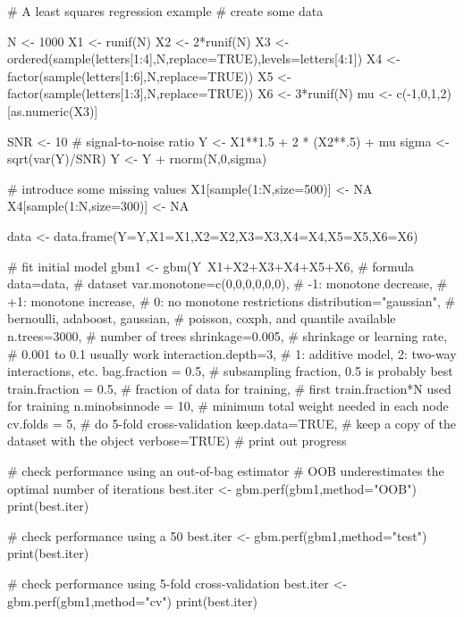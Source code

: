 \documentclass{article}
\begin{document}
\begin{Examples}
\begin{ExampleCode}
# A least squares regression example
# create some data

N <- 1000
X1 <- runif(N)
X2 <- 2*runif(N)
X3 <- ordered(sample(letters[1:4],N,replace=TRUE),levels=letters[4:1])
X4 <- factor(sample(letters[1:6],N,replace=TRUE))
X5 <- factor(sample(letters[1:3],N,replace=TRUE))
X6 <- 3*runif(N)
mu <- c(-1,0,1,2)[as.numeric(X3)]

SNR <- 10 # signal-to-noise ratio
Y <- X1**1.5 + 2 * (X2**.5) + mu
sigma <- sqrt(var(Y)/SNR)
Y <- Y + rnorm(N,0,sigma)

# introduce some missing values
X1[sample(1:N,size=500)] <- NA
X4[sample(1:N,size=300)] <- NA

data <- data.frame(Y=Y,X1=X1,X2=X2,X3=X3,X4=X4,X5=X5,X6=X6)

# fit initial model
gbm1 <- gbm(Y~X1+X2+X3+X4+X5+X6,         # formula
    data=data,                   # dataset
    var.monotone=c(0,0,0,0,0,0), # -1: monotone decrease,
                                 # +1: monotone increase,
                                 #  0: no monotone restrictions
    distribution="gaussian",     # bernoulli, adaboost, gaussian,
                                 # poisson, coxph, and quantile available
    n.trees=3000,                # number of trees
    shrinkage=0.005,             # shrinkage or learning rate,
                                 # 0.001 to 0.1 usually work
    interaction.depth=3,         # 1: additive model, 2: two-way interactions, etc.
    bag.fraction = 0.5,          # subsampling fraction, 0.5 is probably best
    train.fraction = 0.5,        # fraction of data for training,
                                 # first train.fraction*N used for training
    n.minobsinnode = 10,         # minimum total weight needed in each node
    cv.folds = 5,                # do 5-fold cross-validation
    keep.data=TRUE,              # keep a copy of the dataset with the object
    verbose=TRUE)                # print out progress

# check performance using an out-of-bag estimator
# OOB underestimates the optimal number of iterations
best.iter <- gbm.perf(gbm1,method="OOB")
print(best.iter)

# check performance using a 50%
best.iter <- gbm.perf(gbm1,method="test")
print(best.iter)

# check performance using 5-fold cross-validation
best.iter <- gbm.perf(gbm1,method="cv")
print(best.iter)


\end{ExampleCode}
\end{Examples}
\end{document}
